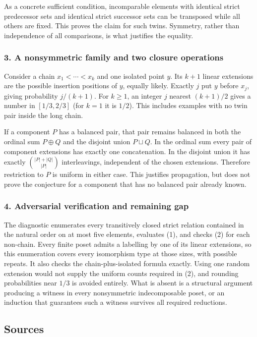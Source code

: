 \documentclass[11pt,a4paper]{article}
\begin{document}
As a concrete sufficient condition, incomparable elements with identical strict predecessor sets and identical strict successor sets can be transposed while all others are fixed. This proves the claim for such twins. Symmetry, rather than independence of all comparisons, is what justifies the equality.

\subsubsection{3. A nonsymmetric family and two closure operations}
Consider a chain $x_1<\cdots<x_k$ and one isolated point $y$. Its $k+1$ linear extensions are the possible insertion positions of $y$, equally likely. Exactly $j$ put $y$ before $x_j$, giving probability $j/(k+1)$. For $k\geq1$, an integer $j$ nearest $(k+1)/2$ gives a number in $[1/3,2/3]$ (for $k=1$ it is $1/2$). This includes examples with no twin pair inside the long chain.

If a component $P$ has a balanced pair, that pair remains balanced in both the ordinal sum $P\oplus Q$ and the disjoint union $P\sqcup Q$. In the ordinal sum every pair of component extensions has exactly one concatenation. In the disjoint union it has exactly $\binom{|P|+|Q|}{|P|}$ interleavings, independent of the chosen extensions. Therefore restriction to $P$ is uniform in either case. This justifies propagation, but does not prove the conjecture for a component that has no balanced pair already known.

\subsubsection{4. Adversarial verification and remaining gap}
The diagnostic enumerates every transitively closed strict relation contained in the natural order on at most five elements, evaluates (1), and checks (2) for each non-chain. Every finite poset admits a labelling by one of its linear extensions, so this enumeration covers every isomorphism type at those sizes, with possible repeats. It also checks the chain-plus-isolated formula exactly. Using one random extension would not supply the uniform counts required in (2), and rounding probabilities near $1/3$ is avoided entirely. What is absent is a structural argument producing a witness in every nonsymmetric indecomposable poset, or an induction that guarantees such a witness survives all required reductions.

\subsection{Sources}
\end{document}
